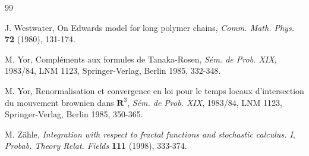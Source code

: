 \begin{thebibliography}{99}








  J. Westwater, On Edwards model for long polymer chains, 
\textit{Comm. Math. Phys.} \textbf{72} (1980), 131-174.

  M. Yor, Compl\'{e}ments aux formules de Tanaka-Rosen, \textit{%
S\'{e}m. de Prob. XIX}, 1983/84, LNM 1123, Springer-Verlag, Berlin 1985,
332-348.

  M. Yor, Renormalisation et convergence en loi pour le temps
locaux d'intersection du mouvement brownien dans $\mathbf{R}^{3}$, \textit{
S\'{e}m. de Prob. XIX}, 1983/84, LNM 1123, Springer-Verlag, Berlin 1985,
350-365.

 M. Z\"ahle, \textit{Integration with respect to fractal functions
  and stochastic calculus. I}, \textit{Probab. Theory Relat. Fields}
  \textbf{111} (1998), 333-374.

\end{thebibliography}

\vfill
{}


